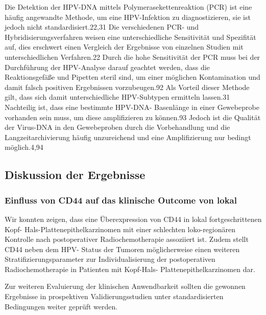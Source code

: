 Die Detektion der HPV-DNA mittels Polymerasekettenreaktion (PCR) ist eine häufig angewandte Methode, um eine HPV-Infektion zu diagnostizieren, sie ist jedoch nicht standardisiert.22,31 Die verschiedenen PCR- und Hybridisierungsverfahren weisen eine unterschiedliche Sensitivität und Spezifität auf, dies erschwert einen Vergleich der Ergebnisse von einzelnen Studien mit unterschiedlichen Verfahren.22 Durch die hohe Sensitivität der PCR muss bei der Durchführung der HPV-Analyse darauf geachtet werden, dass die Reaktionsgefäße und Pipetten steril sind, um einer möglichen Kontamination und damit falsch positiven Ergebnissen vorzubeugen.92 Als Vorteil dieser Methode gilt, dass sich damit unterschiedliche HPV-Subtypen ermitteln lassen.31 Nachteilig ist, dass eine bestimmte HPV-DNA- Basenlänge in einer Gewebeprobe vorhanden sein muss, um diese amplifizieren zu können.93 Jedoch ist die Qualität der Virus-DNA in den Gewebeproben durch die Vorbehandlung und die Langzeitarchivierung häufig unzureichend und eine Amplifizierung nur bedingt möglich.4,94

\hypertarget{diskussion-der-ergebnisse}{%
\subsection{Diskussion der Ergebnisse}\label{diskussion-der-ergebnisse}}

\hypertarget{einfluss-von-cd44-auf-das-klinische-outcome-von-lokal}{%
\subsubsection{Einfluss von CD44 auf das klinische Outcome von lokal}\label{einfluss-von-cd44-auf-das-klinische-outcome-von-lokal}}

Wir konnten zeigen, dass eine Überexpression von CD44 in lokal fortgeschrittenen Kopf- Hals-Plattenepithelkarzinomen mit einer schlechten loko-regionären Kontrolle nach postoperativer Radiochemotherapie assoziiert ist. Zudem stellt CD44 neben dem HPV- Status der Tumoren möglicherweise einen weiteren Stratifizierungsparameter zur Individualisierung der postoperativen Radiochemotherapie in Patienten mit Kopf-Hals- Plattenepithelkarzinomen dar.

Zur weiteren Evaluierung der klinischen Anwendbarkeit sollten die gewonnen Ergebnisse in prospektiven Validierungsstudien unter standardisierten Bedingungen weiter geprüft werden.

